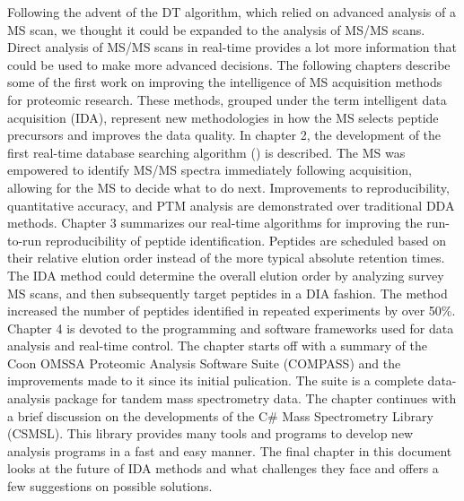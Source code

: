 Following the advent of the DT algorithm, which relied on advanced analysis of a MS scan, we thought it could be expanded to the analysis of MS/MS scans. Direct analysis of MS/MS scans in real-time provides a lot more information that could be used to make more advanced decisions. The following chapters describe some of the first work on improving the intelligence of MS acquisition methods for proteomic research. These methods, grouped under the term intelligent data acquisition (IDA), represent new methodologies in how the MS selects peptide precursors and improves the data quality. In chapter 2, the development of the first real-time database searching algorithm (\inseq{}) is described. The MS was empowered to identify MS/MS spectra immediately following acquisition, allowing for the MS to decide what to do next. Improvements to reproducibility, quantitative accuracy, and PTM analysis are demonstrated over traditional DDA methods. Chapter 3 summarizes our real-time algorithms for improving the run-to-run reproducibility of peptide identification. Peptides are scheduled based on their relative elution order instead of the more typical absolute retention times. The IDA method could determine the overall elution order by analyzing survey MS scans, and then subsequently target peptides in a DIA fashion. The method increased the number of peptides identified in repeated experiments by over 50\%. Chapter 4 is devoted to the programming and software frameworks used for data analysis and real-time control. The chapter starts off with a summary of the Coon OMSSA Proteomic Analysis Software Suite (COMPASS) and the improvements made to it since its initial pulication.\cite{compass} The suite is a complete data-analysis package for tandem mass spectrometry data. The chapter continues with a brief discussion on the developments of the C\# Mass Spectrometry Library (CSMSL). This library provides many tools and programs to develop new analysis programs in a fast and easy manner. The final chapter in this document looks at the future of IDA methods and what challenges they face and offers a few suggestions on possible solutions.


